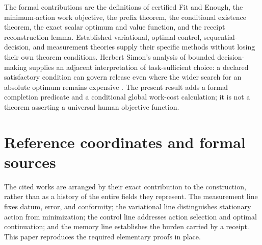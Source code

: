 \documentclass[11pt,letterpaper]{article}
\theoremstyle{definition}\newtheorem{definition}{Definition}
\begin{document}
The formal contributions are the definitions of certified Fit and Enough, the minimum-action work objective, the prefix theorem, the conditional existence theorem, the exact scalar optimum and value function, and the receipt reconstruction lemma. Established variational, optimal-control, sequential-decision, and measurement theories supply their specific methods without losing their own theorem conditions. Herbert Simon's analysis of bounded decision-making supplies an adjacent interpretation of task-sufficient choice: a declared satisfactory condition can govern release even where the wider search for an absolute optimum remains expensive \cite{simon}. The present result adds a formal completion predicate and a conditional global work-cost calculation; it is not a theorem asserting a universal human objective function.

\begin{center}\vspace{0.5em}
\end{center}

\section*{Reference coordinates and formal sources}
The cited works are arranged by their exact contribution to the construction, rather than as a history of the entire fields they represent. The measurement line fixes datum, error, and conformity; the variational line distinguishes stationary action from minimization; the control line addresses action selection and optimal continuation; and the memory line establishes the burden carried by a receipt. This paper reproduces the required elementary proofs in place.
\end{document}
